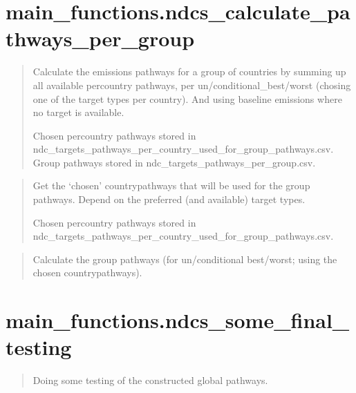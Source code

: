 \documentclass[letterpaper,10pt,english]{sphinxmanual}
\begin{document}
\chapter{main\_functions.ndcs\_calculate\_pathways\_per\_group}
\label{\detokenize{code:main-functions-ndcs-calculate-pathways-per-group}}
\begin{quote}

Calculate the emissions pathways for a group of countries by summing up all available per\sphinxhyphen{}country pathways,
per un/conditional\_best/worst (chosing one of the target types per country).
And using baseline emissions where no target is available.

Chosen per\sphinxhyphen{}country pathways stored in ndc\_targets\_pathways\_per\_country\_used\_for\_group\_pathways.csv.
Group pathways stored in ndc\_targets\_pathways\_per\_group.csv.
\end{quote}

\begin{quote}

Get the ‘chosen’ country\sphinxhyphen{}pathways that will be used for the group pathways.
Depend on the preferred (and available) target types.

Chosen per\sphinxhyphen{}country pathways stored in ndc\_targets\_pathways\_per\_country\_used\_for\_group\_pathways.csv.
\end{quote}

\begin{quote}

Calculate the group pathways (for un/conditional best/worst; using the chosen country\sphinxhyphen{}pathways).
\end{quote}


\chapter{main\_functions.ndcs\_some\_final\_testing}
\label{\detokenize{code:main-functions-ndcs-some-final-testing}}
\begin{quote}

Doing some testing of the constructed global pathways.
\end{quote}
\end{document}

